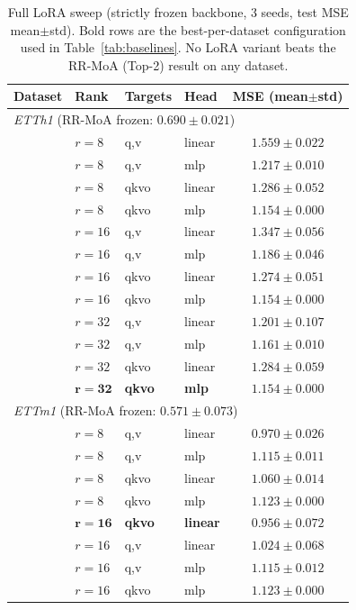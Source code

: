 \documentclass{article}
\begin{document}
\begin{table}[!htbp]
\centering
\caption{Full LoRA sweep (strictly frozen backbone, 3 seeds, test MSE mean$\pm$std). Bold rows are the best-per-dataset configuration used in Table~\ref{tab:baselines}. No LoRA variant beats the RR-MoA (Top-2) result on any dataset.}
\label{tab:lora_sweep}
\small
\begin{tabular}{@{}llllc@{}}
\toprule
Dataset & Rank & Targets & Head & MSE (mean$\pm$std) \\
\midrule
\multicolumn{5}{l}{\textit{ETTh1} (RR-MoA frozen: $\mathbf{0.690 \pm 0.021}$)} \\
& $r{=}8$  & q,v   & linear & $1.559 \pm 0.022$ \\
& $r{=}8$  & q,v   & mlp    & $1.217 \pm 0.010$ \\
& $r{=}8$  & qkvo  & linear & $1.286 \pm 0.052$ \\
& $r{=}8$  & qkvo  & mlp    & $1.154 \pm 0.000$ \\
& $r{=}16$ & q,v   & linear & $1.347 \pm 0.056$ \\
& $r{=}16$ & q,v   & mlp    & $1.186 \pm 0.046$ \\
& $r{=}16$ & qkvo  & linear & $1.274 \pm 0.051$ \\
& $r{=}16$ & qkvo  & mlp    & $1.154 \pm 0.000$ \\
& $r{=}32$ & q,v   & linear & $1.201 \pm 0.107$ \\
& $r{=}32$ & q,v   & mlp    & $1.161 \pm 0.010$ \\
& $r{=}32$ & qkvo  & linear & $1.284 \pm 0.059$ \\
& $\mathbf{r{=}32}$ & \textbf{qkvo} & \textbf{mlp} & $\mathbf{1.154 \pm 0.000}$ \\
\midrule
\multicolumn{5}{l}{\textit{ETTm1} (RR-MoA frozen: $\mathbf{0.571 \pm 0.073}$)} \\
& $r{=}8$  & q,v   & linear & $0.970 \pm 0.026$ \\
& $r{=}8$  & q,v   & mlp    & $1.115 \pm 0.011$ \\
& $r{=}8$  & qkvo  & linear & $1.060 \pm 0.014$ \\
& $r{=}8$  & qkvo  & mlp    & $1.123 \pm 0.000$ \\
& $\mathbf{r{=}16}$ & \textbf{qkvo} & \textbf{linear} & $\mathbf{0.956 \pm 0.072}$ \\
& $r{=}16$ & q,v   & linear & $1.024 \pm 0.068$ \\
& $r{=}16$ & q,v   & mlp    & $1.115 \pm 0.012$ \\
& $r{=}16$ & qkvo  & mlp    & $1.123 \pm 0.000$ \\

\end{tabular}
\end{table}
\end{document}

